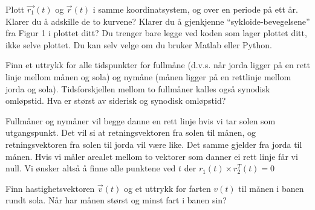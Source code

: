 \documentclass{../../myassignment}
\begin{document}
	\newpage

	\begin{problem}
		Plott $\vec{r_1}(t)$ og $\vec{r}(t)$ i samme koordinatsystem, og over en periode på ett år. Klarer du å adskille de to kurvene? Klarer du å gjenkjenne “sykloide-bevegelsene” fra Figur 1 i plottet ditt? Du trenger bare legge ved koden som lager plottet ditt, ikke selve plottet. Du kan selv velge om du bruker Matlab eller Python.
	\end{problem}
	\begin{answer}
		
	\end{answer}

	\begin{problem}
		Finn et uttrykk for alle tidspunkter for fullmåne (d.v.s. når jorda ligger på en rett linje mellom månen og sola) og nymåne (månen ligger på en rettlinje mellom jorda og sola). Tidsforskjellen mellom to fullmåner kalles også synodisk omløpstid. Hva er størst av siderisk og synodisk omløpstid?	
	\end{problem}	

	\begin{answer}
		Fullm{\aa}ner og nym{\aa}ner vil begge danne en rett linje hvis vi tar solen som utgangspunkt. Det vil si at retningsvektoren fra solen til m{\aa}nen, og retningsvektoren fra solen til jorda vil v{\ae}re like. Det samme gjelder fra jorda til m{\aa}nen. Hvis vi m{\aa}ler arealet mellom to vektorer som danner ei rett linje f{\aa}r vi null. Vi {\o}nsker alts{\aa} {\aa} finne alle punktene ved $t$ der $r_1(t)\times r_2^T(t) = 0$

	\end{answer}

	\begin{problem}
		Finn hastighetsvektoren $\vec{v}(t)$ og et uttrykk for farten $v(t)$ til månen i banen rundt sola. Når har månen størst og minst fart i banen sin?
	\end{problem}
\end{document}
